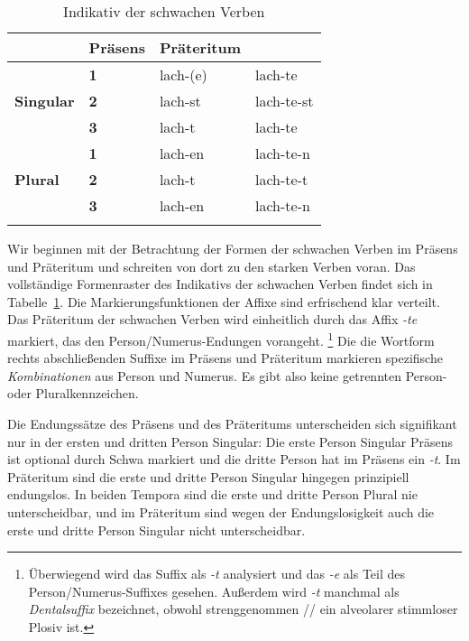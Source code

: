 \begin{table}[!htbp]
  \centering
  \begin{tabular}{llll}
    \lsptoprule
    \multicolumn{2}{c}{} & \textbf{Präsens} & \textbf{Präteritum} \\
    \midrule
    \multirow{3}{*}{\textbf{Singular}} & \textbf{1} & lach-(e) & lach-te \\
    & \textbf{2} & lach-st & lach-te-st \\
    &\textbf{3} & lach-t & lach-te \\
    \midrule
    \multirow{3}{*}{\textbf{Plural}} & \textbf{1} & lach-en & lach-te-n \\
    & \textbf{2} & lach-t & lach-te-t \\
    & \textbf{3} & lach-en & lach-te-n \\
    \lspbottomrule
  \end{tabular}
  \caption{Indikativ der schwachen Verben}
  \label{tab:tempusnumerusundperson082}
\end{table}


Wir beginnen mit der Betrachtung der Formen der schwachen Verben im Präsens und Präteritum und schreiten von dort zu den starken Verben voran.
Das vollständige Formenraster des Indikativs der schwachen Verben findet sich in Tabelle~\ref{tab:tempusnumerusundperson082}.
Die Markierungsfunktionen der Affixe sind erfrischend klar verteilt.
Das Präteritum der schwachen Verben wird einheitlich durch das Affix \textit{-te} markiert, das den Person\slash Numerus-Endungen vorangeht.%
\footnote{Überwiegend wird das Suffix als \textit{-t} analysiert und das \textit{-e} als Teil des Person\slash Numerus-Suffixes gesehen.
Außerdem wird \textit{-t} manchmal als \textit{Dentalsuffix} bezeichnet, obwohl strenggenommen // ein alveolarer stimmloser Plosiv ist.}
Die die Wortform rechts abschließenden Suffixe im Präsens und Präteritum markieren spezifische \textit{Kombinationen} aus Person und Numerus.
Es gibt also keine getrennten Person- oder Pluralkennzeichen.

Die Endungssätze des Präsens und des Präteritums unterscheiden sich signifikant nur in der ersten und dritten Person Singular:
Die erste Person Singular Präsens ist optional durch Schwa markiert und die dritte Person hat im Präsens ein \textit{-t}.
Im Präteritum sind die erste und dritte Person Singular hingegen prinzipiell endungslos.
In beiden Tempora sind die erste und dritte Person Plural nie unterscheidbar, und im Präteritum sind wegen der Endungslosigkeit auch die erste und dritte Person Singular nicht unterscheidbar.

